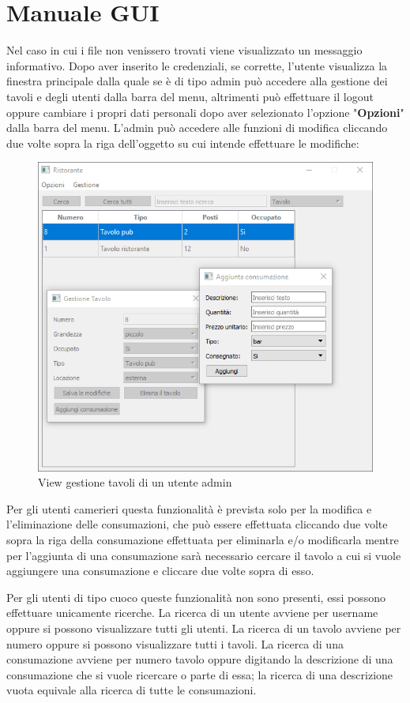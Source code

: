 \section{Manuale GUI}
Nel caso in cui i file non venissero trovati viene visualizzato un messaggio informativo. Dopo aver inserito le credenziali, se corrette, l'utente visualizza la finestra principale dalla quale se è di tipo admin può accedere alla gestione dei tavoli e degli utenti dalla barra del menu, altrimenti può effettuare il logout oppure cambiare i propri dati personali dopo aver selezionato l'opzione "\textbf{Opzioni}" dalla barra del menu.
L'admin può accedere alle funzioni di modifica cliccando due volte sopra la riga dell'oggetto su cui intende effettuare le modifiche:
\clearpage
\begin{figure}[!h]
\centering
\includegraphics[scale=0.60]{res/sections/immagini/gui.png}
\caption{View gestione tavoli di un utente admin}
\end{figure}

Per gli utenti camerieri questa funzionalità è prevista solo per la modifica e l'eliminazione delle consumazioni, che può essere effettuata cliccando due volte sopra la riga della consumazione effettuata per eliminarla e/o modificarla mentre per l'aggiunta di una consumazione sarà necessario cercare il tavolo a cui si vuole aggiungere una consumazione e cliccare due volte sopra di esso.

Per gli utenti di tipo cuoco queste funzionalità non sono presenti, essi possono effettuare unicamente ricerche.
La ricerca di un utente avviene per username oppure si possono visualizzare tutti gli utenti.
La ricerca di un tavolo avviene per numero oppure si possono visualizzare tutti i tavoli.
La ricerca di una consumazione avviene per numero tavolo oppure digitando la descrizione di una consumazione che si vuole ricercare o parte di essa; la ricerca di una descrizione vuota equivale alla ricerca di tutte le consumazioni.

